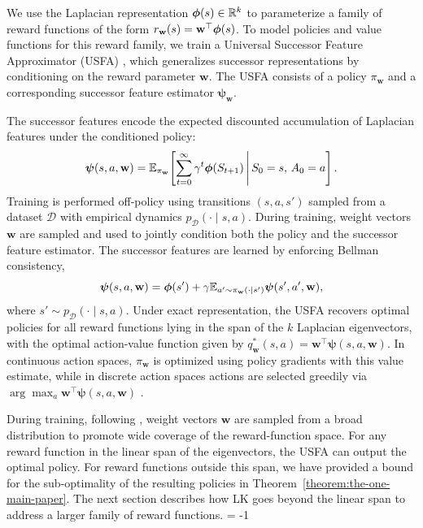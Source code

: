 \documentclass{article}
\theoremstyle{plain}
\theoremstyle{definition}
\theoremstyle{remark}
\begin{document}
We use the Laplacian representation $\bm{\phi}(s) \in \mathbb{R}^k$ to parameterize a family of reward functions of the form
$r_{\mathbf{w}}(s) = \mathbf{w}^\top \bm{\phi}(s)$.
To model policies and value functions for this reward family, we train a Universal Successor Feature Approximator (USFA) \citep{barreto2017successor}, which generalizes successor representations \citep{dayan1993improving} by conditioning on the reward parameter $\mathbf{w}$. The USFA consists of a policy $\pi_{\mathbf{w}}$ and a corresponding successor feature estimator $\bm{\psi}_{\mathbf{w}}$.

The successor features encode the expected discounted accumulation of Laplacian features under the conditioned policy:
\begin{equation}
    \bm{\psi}(s,a,\mathbf{w}) =
    \mathbb{E}_{\pi_{\mathbf{w}}}\!\left[
    \sum_{t=0}^{\infty} \gamma^t \bm{\phi}(S_{t+1})
    \,\middle|\,
    S_0 = s,\, A_0 = a
    \right].
\end{equation}
Training is performed off-policy using transitions $(s,a,s')$ sampled from a dataset $\mathscr{D}$ with empirical dynamics $p_{\mathscr{D}}(\cdot \mid s,a)$. During training, weight vectors $\mathbf{w}$ are sampled and used to jointly condition both the policy and the successor feature estimator. The successor features are learned by enforcing Bellman consistency,
\begin{equation}
    \bm{\psi}(s,a,\mathbf{w})
    =
    \bm{\phi}(s') + \gamma
    \mathbb{E}_{a' \sim \pi_{\mathbf{w}}(\cdot \mid s')}
    \bm{\psi}(s',a',\mathbf{w}),
\end{equation}
where $s' \sim p_{\mathscr{D}}(\cdot \mid s,a)$. Under exact representation, the USFA recovers optimal policies for all reward functions lying in the span of the $k$ Laplacian eigenvectors, with the optimal action-value function given by
$q^*_{\mathbf{w}}(s,a) = \mathbf{w}^\top \bm{\psi}(s,a,\mathbf{w})$.
In continuous action spaces, $\pi_{\mathbf{w}}$ is optimized using policy gradients with this value estimate, while in discrete action spaces actions are selected greedily via
$\arg\max_a \mathbf{w}^\top \bm{\psi}(s,a,\mathbf{w})$
\citep{borsauniversal}.


During training, following \citet{touati2022does}, weight vectors $\mathbf{w}$ are sampled from a broad distribution to promote wide coverage of the reward-function space. For any reward function in the linear span of the eigenvectors, the USFA can output the optimal policy. For reward functions outside this span, we have provided a bound for the sub-optimality of the resulting policies in Theorem~\ref{theorem:the-one-main-paper}. The next section describes how LK goes beyond the linear span to address a larger family of reward functions. \looseness = -1
\end{document}
